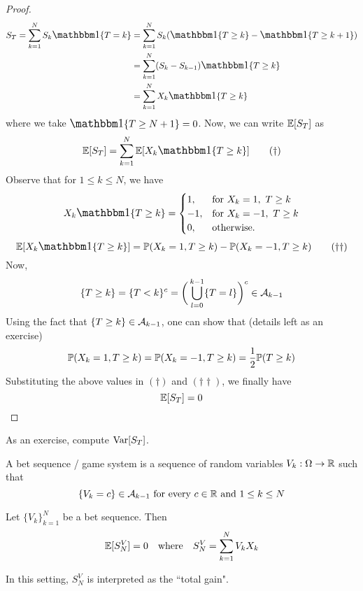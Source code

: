 \documentclass[main]{subfiles}
\begin{document}
\begin{proof}
    \begin{align*}
        S_T=\sum_{k=1}^NS_k\one\{T=k\}
         & = \sum_{k=1}^NS_k(\one\{T\ge k\}-\one\{T\ge k+1\}) \\
         & = \sum_{k=1}^N(S_k-S_{k-1})\one\{T\ge k\}          \\
         & = \sum_{k=1}^NX_k\one\{T\ge k\}
    \end{align*}
    where we take $ \mathlarger{\one}\{T\ge N+1\}=0 $. Now, we can write $ \mathbb E[S_T] $ as \[\E[S_T]=\sum_{k=1}^N\E[X_k\one\{T\ge k\}]\tag{$ \dagger $}\]
    Observe that for $ 1\le k\le N $, we have
    \[
        X_k\one\{T\ge k\} =
        \begin{cases}
            1,  & \text{for } X_k=1,\ T\ge k  \\
            -1, & \text{for } X_k=-1,\ T\ge k \\
            0,  & \text{otherwise.}
        \end{cases}
    \]
    \[\E[X_k\one\{T\ge k\}]=\P(X_k=1,T\ge k)-\P(X_k=-1,T\ge k) \tag{$ \dagger\dagger $}\]
    Now,
    \[\{T\ge k\}=\{T<k\}^c=\bigg(\bigcup_{l=0}^{k-1}\{T=l\}\bigg)^c\in\mathcal A_{k-1}\]
    Using the fact that $ \{T\ge k\}\in\mathcal A_{k-1} $, one can show that (details left as an exercise)
    \[\mathbb P(X_k=1,T\ge k)=\mathbb P(X_k=-1,T\ge k)=\frac{1}{2}\mathbb P(T\ge k)\]
    Substituting the above values in $ (\dagger) $ and $ (\dagger\dagger) $, we finally have
    \[\mathbb E[S_T]=0\]
\end{proof}

As an exercise, compute $ {\mathrm{Var}}[S_T] $.\\

\begin{definition}
    A bet sequence / game system is a sequence of random variables $ V_k:\Omega\to\mathbb R $ such that
    \[\{V_k=c\}\in\mathcal A_{k-1}\text{ for every }c\in\mathbb R\text{ and }1\le k\le N\]
\end{definition}

\begin{theorem}
    Let $ \{V_k\}_{k=1}^N $ be a bet sequence. Then
    \[\mathbb E[S_N^V]=0\text{\quad where\quad}S_N^V=\sum_{k=1}^NV_kX_k\]
\end{theorem}

In this setting, $ S_N^V $ is interpreted as the ``total gain".
\end{document}
